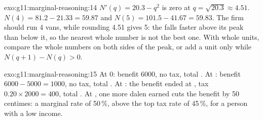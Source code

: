 \begin{solution}{exo:g11:marginal-reasoning:14}
$N'(q) = 20.3 - q^2$ is zero at $q = \sqrt{20.3} \approx 4.51$. $N(4) = 81.2 - 21.33 = 59.87$ and $N(5) = 101.5 - 41.67 = 59.83$. The firm should run 4 vans, while
rounding 4.51 gives 5: the  falls faster above its peak than below it, so the nearest whole number is not the best one. With whole units, compare the
whole numbers on both sides of the peak, or add a unit only while $N(q + 1) - N(q) > 0$.
\end{solution}

\begin{solution}{exo:g11:marginal-reasoning:15}
At 0: benefit 6000, no tax, total . At : benefit $6000 - 5000 = 1000$, no tax, total . At : the benefit ended at , tax
$0.20 \times 2000 = 400$, total . At , one more dalen earned cuts the benefit by 50 centimes: a marginal rate of 50\,\%, above the top tax rate of
45\,\%, for a person with a low income.
\end{solution}

